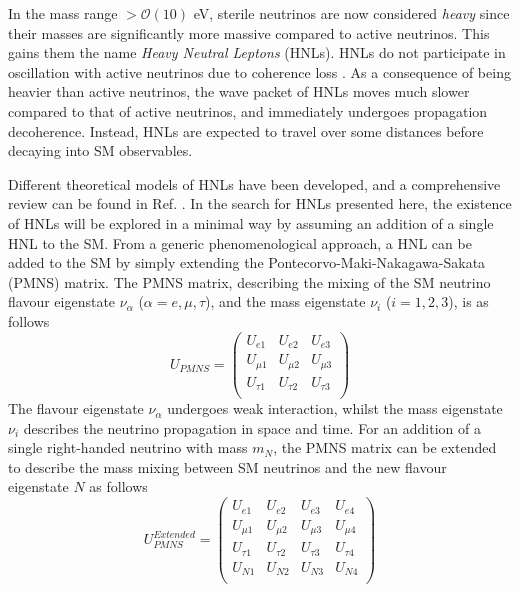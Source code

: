 In the mass range $> \mathcal{O}(10)$ eV, sterile neutrinos are now considered \textit{heavy} since their masses are significantly more massive compared to active neutrinos.
This gains them the name \textit{Heavy Neutral Leptons} (HNLs).
HNLs do not participate in oscillation with active neutrinos due to coherence loss \cite{SBNHNL}.
As a consequence of being heavier than active neutrinos, the wave packet of HNLs moves much slower compared to that of active neutrinos, and immediately undergoes propagation decoherence.
Instead, HNLs are expected to travel over some distances before decaying into SM observables.

Different theoretical models of HNLs have been developed, and a comprehensive review can be found in Ref. \cite{HNLWhitePaper}. 
In the search for HNLs presented here, the existence of HNLs will be explored in a minimal way by assuming an addition of a single HNL to the SM.  
From a generic phenomenological approach, a HNL can be added to the SM by simply extending the Pontecorvo-Maki-Nakagawa-Sakata (PMNS) matrix.
The PMNS matrix, describing the mixing of the SM neutrino flavour eigenstate $\nu_{\alpha}$ ($\alpha=e,\mu,\tau$), and the mass eigenstate $\nu_{i}$ ($i=1,2,3$), is as follows 
\begin{equation}
	U_{PMNS} =
	\begin{pmatrix}
		U_{e1} & U_{e2} & U_{e3}\\
		U_{\mu1} & U_{\mu2} & U_{\mu3}\\
		U_{\tau1} & U_{\tau2} & U_{\tau3}\\
	\end{pmatrix}
\end{equation}
The flavour eigenstate $\nu_{\alpha}$ undergoes weak interaction, whilst the mass eigenstate $\nu_{i}$ describes the neutrino propagation in space and time.
For an addition of a single right-handed neutrino with mass $m_{N}$, the PMNS matrix can be extended to describe the mass mixing between SM neutrinos and the new flavour eigenstate $N$ as follows 
\begin{equation}
	U_{PMNS}^{Extended} =
	\begin{pmatrix}
		U_{e1} & U_{e2} & U_{e3} & U_{e4}\\
		U_{\mu1} & U_{\mu2} & U_{\mu3} & U_{\mu4}\\
		U_{\tau1} & U_{\tau2} & U_{\tau3} & U_{\tau4}\\
		U_{N1} & U_{N2} & U_{N3} & U_{N4}\\
	\end{pmatrix}
\end{equation}
